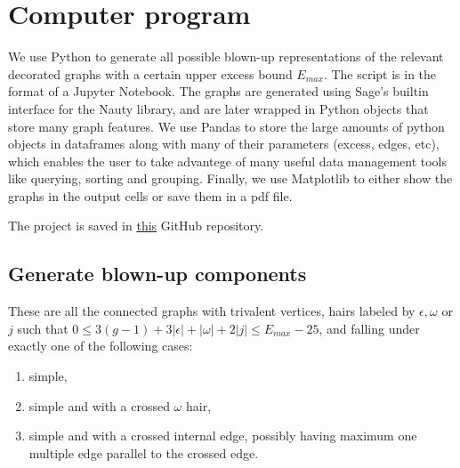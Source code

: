 \section{Computer program}


\newcommand{\myB}{\bGK^{12,1}}

We use Python to generate all possible blown-up representations of the relevant decorated graphs with a certain upper excess bound $E_{max}$. The script is in the format of a Jupyter Notebook. The graphs are generated using Sage's builtin interface for the Nauty library, and are later wrapped in Python objects that store many graph features. We use Pandas to store the large amounts of python objects in dataframes along with many of their parameters (excess, edges, etc), which enables the user to take advantege of many useful data management tools like querying, sorting and grouping. Finally, we use Matplotlib to either show the graphs in the output cells or save them in a pdf file.

The project is saved in \href{https://github.com/bellimarco/Getzler-Kapranov-Graph-Cohomology-Computations-in-weight-13}{this} GitHub repository.

\subsection{Generate blown-up components} \label{subsec:genBlownup} These are all the connected graphs with trivalent vertices, hairs labeled by $\epsilon,\omega$ or $j$ such that $0\leq 3(g-1)+3|\epsilon|+|\omega|+2|j| \leq E_{max}-25$, and falling under exactly one of the following cases:
\begin{enumerate}
    \item simple,
    \item simple and with a crossed $\omega$ hair,
    \item simple and with a crossed internal edge, possibly having maximum one multiple edge parallel to the crossed edge.
\end{enumerate}

